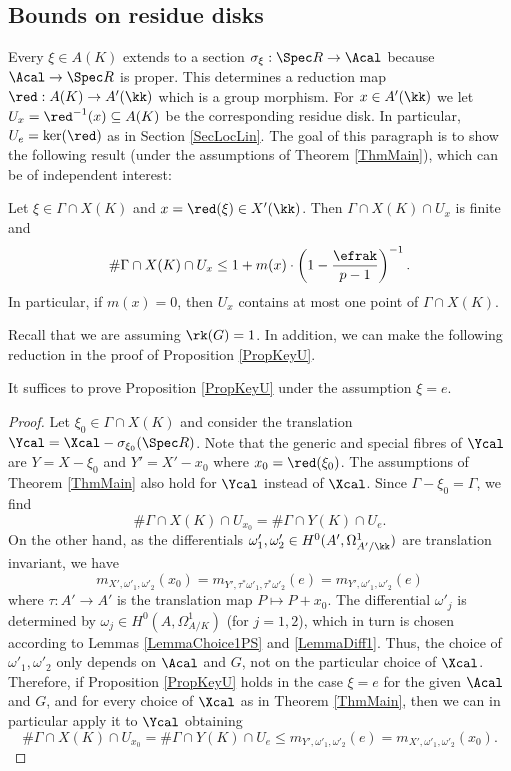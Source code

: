 

\subsection{Bounds on residue disks}\label{SecResDisk} %



Every $\xi\in A(K)$ extends to a section $\sigma_\xi:\Spec R\to \Acal$ because $\Acal\to \Spec R$ is proper. This determines a reduction map $\red: A(K)\to A'(\kk)$ which is a group morphism. For $x\in A'(\kk)$ we let $U_x=\red^{-1}(x)\subseteq A(K)$ be the corresponding residue disk. In particular, $U_e=\ker(\red)$ as in Section \ref{SecLocLin}. The goal of this paragraph is to show the following result (under the assumptions of Theorem \ref{ThmMain}), which can be of independent interest:

\begin{proposition}
\notready\label{PropKeyU} Let $\xi\in \Gamma\cap X(K)$ and  $x=\red(\xi)\in X'(\kk)$. Then $\Gamma\cap X(K)\cap U_x$ is finite and
$$
\# \Gamma\cap X(K)\cap U_x\le 1+ m(x)\cdot  \left(1-\frac{\efrak}{p-1}\right)^{-1}.
$$
In particular, if $m(x)=0$, then $U_x$ contains at most one point of $\Gamma\cap X(K)$.
\end{proposition}

Recall that we are assuming $\rk(G)=1$. In addition, we can make the following reduction in the proof of Proposition \ref{PropKeyU}.

\begin{lemma}
\notready\label{LemmaXY} It suffices to prove Proposition \ref{PropKeyU} under the assumption $\xi=e$.
\end{lemma}
\begin{proof} Let $\xi_0\in \Gamma\cap X(K)$ and consider the translation $\Ycal=\Xcal- \sigma_{\xi_0}(\Spec R)$. Note that the generic and special fibres of $\Ycal$ are $Y=X-\xi_0$ and $Y'=X'-x_0$ where $x_0=\red(\xi_0)$. The assumptions of Theorem \ref{ThmMain} also hold for $\Ycal$ instead of $\Xcal$. Since $\Gamma-\xi_0=\Gamma$, we find
$$
\# \Gamma\cap X(K)\cap U_{x_0} = \# \Gamma \cap Y(K)\cap U_e.
$$
On the other hand, as the differentials $\omega'_1,\omega'_2\in H^0(A',\Omega^1_{A'/\kk})$ are translation invariant, we have
$$
m_{X',\omega'_1,\omega'_2}(x_0)=m_{Y',\tau^*\omega'_1,\tau^*\omega'_2}(e)=m_{Y',\omega'_1,\omega'_2}(e)
$$
where $\tau:A'\to A'$ is the translation map $P\mapsto P+x_0$. The differential $\omega'_j$ is determined by $\omega_j\in H^0(A, \Omega^1_{A/K})$ (for $j=1,2$), which in turn is chosen according to Lemmas \ref{LemmaChoice1PS} and  \ref{LemmaDiff1}. Thus, the choice of $\omega'_1,\omega'_2$  only depends on $\Acal$ and $G$, not on the particular choice of $\Xcal$. Therefore, if Proposition \ref{PropKeyU} holds in the case $\xi=e$ for the given $\Acal$ and $G$, and for every choice of $\Xcal$ as in Theorem \ref{ThmMain}, then we can in particular apply it to $\Ycal$ obtaining
$$
\# \Gamma\cap X(K)\cap U_{x_0} = \# \Gamma \cap Y(K)\cap U_e\le m_{Y',\omega'_1,\omega'_2}(e)=m_{X',\omega'_1,\omega'_2}(x_0).
$$
\end{proof}

